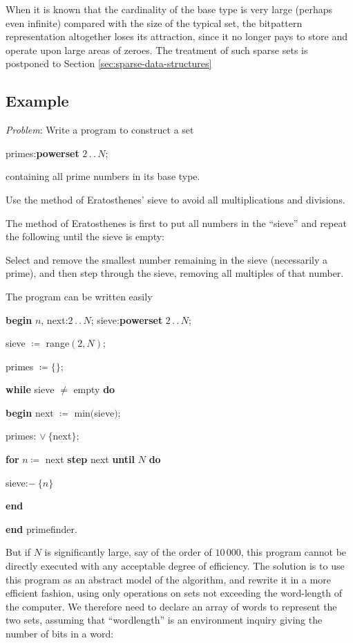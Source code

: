 \documentclass[twoside,11pt]{book}
\begin{document}
When it is known that the cardinality of the base type is very large (perhaps even infinite) compared with the size of the typical set, the bitpattern representation altogether loses its attraction, since it no longer pays to store and operate upon large areas of zeroes. The treatment of such sparse sets is postponed to Section \ref{sec:sparse-data-structures}

\subsection{Example}

\noindent
\textit{Problem}: Write a program to construct a set

\quad primes:\textbf{powerset} $2\,.\,.\,N$;

\noindent
containing all prime numbers in its base type.

\noindent
Use the method of Eratosthenes' sieve to avoid all multiplications and divisions.

The method of Eratosthenes is first to put all numbers in the ``sieve'' and repeat the following until the sieve is empty:

\noindent
Select and remove the smallest number remaining in the sieve (necessarily a prime), and then step through the sieve, removing all multiples of that number.

The program can be written easily

\noindent
\textbf{begin} $n$, next:$2\,.\,.\,N$; sieve:\textbf{powerset} $2\,.\,.\,N$;

\noindent
\quad sieve $\coloneq$ range$(2, N)$;

\noindent
\quad primes $\coloneq \{\}$;

\noindent
\quad \textbf{while} sieve $\neq$ empty \textbf{do}

\noindent
\quad \quad \textbf{begin} next $\coloneq$ min$($sieve$)$;

\noindent
\quad \quad \quad primes: $\vee\ \{$next$\}$;

\noindent
\quad \quad \quad \textbf{for} $n\coloneq$ next \textbf{step} next \textbf{until} $N$ \textbf{do}

\noindent
\quad \quad \quad \quad sieve:$-\ \{n\}$

\noindent
\quad \quad \textbf{end}

\noindent
\textbf{end} primefinder.

But if $N$ is significantly large, say of the order of $10\,000$, this program cannot be directly executed with any acceptable degree of efficiency. The solution is to use this program as an abstract model of the algorithm, and rewrite it in a more efficient fashion, using only operations on sets not exceeding the word-length of the computer. We therefore need to declare an array of words to represent the two sets, assuming that ``wordlength'' is an environment inquiry giving the number of bits in a word:
\end{document}
